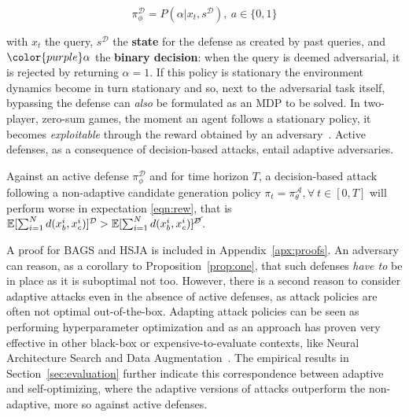 \begin{equation}
\pi_\phi^{\mathcal{D}} = P(\alpha|x_t,s^{\mathcal{D}}), \: a \in \{0,1\}
\label{eqn:def}
\end{equation}

\noindent with $x_t$ the query, $s^{\mathcal{D}}$ the \textbf{state} for the defense as created by past queries, and $\color{purple}\alpha$ the \textbf{binary decision}: when the query is deemed adversarial, it is rejected by returning $\alpha=1$.
If this policy is stationary the environment dynamics become in turn stationary and so, next to the adversarial task itself, bypassing the defense can \emph{also} be formulated as an MDP to be solved.
In two-player, zero-sum games, the moment an agent follows a stationary policy, it becomes \textit{exploitable} through the reward obtained by an adversary~\cite{timbers2022approximate}.
Active defenses, as a consequence of decision-based attacks, entail adaptive adversaries.

\begin{proposition}
Against an active defense $\pi_\phi^{\mathcal{D}}$ and for time horizon $T$, a decision-based attack following a non-adaptive candidate generation policy $\pi_t = \pi_\theta^\mathcal{A}, \forall \: t \in [0,T]$ will perform worse in expectation \eqref{eqn:rew}, that is $\mathbb{E}[\sum_{i=1}^{N}d(x^i_b,x^i_c)]^{\mathcal{D}} > \mathbb{E}[\sum_{i=1}^{N}d(x^i_b,x^i_c)]^{\cancel{\mathcal{D}}}$.
\label{prop:two}
\end{proposition}

A proof for BAGS and HSJA is included in Appendix~\ref{apx:proofs}.
An adversary can reason, as a corollary to Proposition~\ref{prop:one}, that such defenses \emph{have to} be in place as it is suboptimal not too.
However, there is a second reason to consider adaptive attacks even in the absence of active defenses, as attack policies are often not optimal out-of-the-box.
Adapting attack policies can be seen as performing hyperparameter optimization and as an approach has proven very effective in other black-box or expensive-to-evaluate contexts, like Neural Architecture Search and Data Augmentation~\cite{zoph2016neural, pham2021autodropout}.
The empirical results in Section~\ref{sec:evaluation} further indicate this correspondence between adaptive and self-optimizing, where the adaptive versions of attacks outperform the non-adaptive, more so against active defenses.


